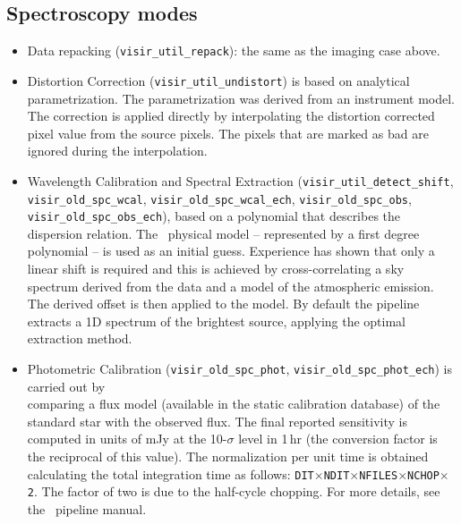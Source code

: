 \subsection{Spectroscopy modes}
\begin{itemize}
\item Data repacking ({\tt visir\_util\_repack}): the same as
the imaging case above.
\item Distortion Correction ({\tt visir\_util\_undistort}) is 
based on analytical parametrization. The parametrization was 
derived from an instrument model. The correction is applied 
directly by interpolating the distortion corrected pixel value 
from the source pixels. The pixels that are marked as bad are 
ignored during the interpolation.
\item Wavelength Calibration and Spectral Extraction
({\tt visir\_util\_detect\_shift},\\ {\tt visir\_old\_spc\_wcal},
{\tt visir\_old\_spc\_wcal\_ech}, {\tt visir\_old\_spc\_obs},\\ 
{\tt visir\_old\_spc\_obs\_ech}), based on a polynomial that 
describes the dispersion relation. The \instname\ physical 
model -- represented by a first degree polynomial -- is used 
as an initial guess. Experience has shown that only a linear 
shift is required and this is achieved by cross-correlating a 
sky spectrum derived from the data and a model of the atmospheric 
emission. The derived offset is then applied to the model.
By default the pipeline extracts a 1D spectrum of the brightest 
source, applying the optimal extraction method. 
\item Photometric Calibration ({\tt visir\_old\_spc\_phot}, 
{\tt visir\_old\_spc\_phot\_ech}) is carried out by\\ comparing 
a flux model (available in the static calibration database) of 
the standard star with the observed flux. The final reported 
sensitivity is computed in units of mJy at the 10-$\sigma$ level 
in 1\,hr (the conversion factor is the reciprocal of this value). 
The normalization per unit time is obtained calculating the 
total integration time as follows: 
{\tt DIT$\times$NDIT$\times$NFILES$\times$NCHOP$\times$2}. The 
factor of two is due to the half-cycle chopping. For more 
details, see the \instname\ pipeline manual.
\end{itemize}

